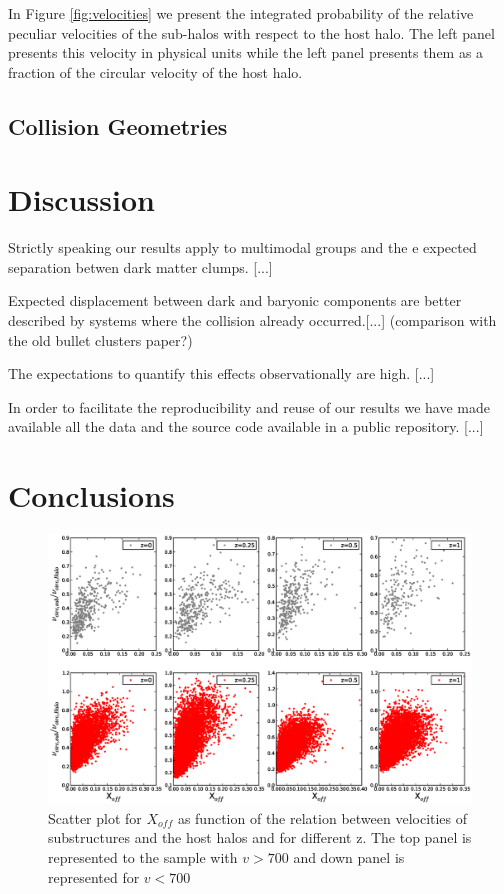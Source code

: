 \documentclass{emulateapj}
\newcommand{\kms}{{\ifmmode{{\mathrm{\,km\ s}^{-1}}}\else{\,km~s$^{-1}$}\fi}}
\begin{document}
In Figure \ref{fig:velocities} we present the integrated probability
of the relative peculiar velocities of the sub-halos with respect to
the host halo. The left panel presents this velocity in physical units
while the left panel presents them as a fraction of the circular
velocity of the host halo. 



\subsection{Collision Geometries}
\label{fig:geometry}

\section{Discussion}
\label{sec:discussion}
Strictly speaking our results apply to multimodal groups and the e
expected separation betwen dark matter clumps. [...]
 
Expected displacement between dark and baryonic components are better
described by systems where the collision already occurred.[...]
(comparison with the old bullet clusters paper?)

The expectations to quantify this effects observationally are
high. [...] 


In order to facilitate the reproducibility and reuse of our results we
have made available all the data and the source code available in a public
repository. [...]  


\section{Conclusions}
\label{sec:conclusions}


\begin{figure}
\begin{center}
\includegraphics[width=1.0\textwidth]{Figures_eps/figure_5_4.eps}
\end{center}
\caption{Scatter plot for $X_{off}$ as function of the relation between velocities of substructures and the host halos and 
for different z. The top panel is represented to the sample with $v > 700$ \kms and down panel is represented 
for $v<700$ \kms} 
\label{cos_theta1}
\end{figure}
\end{document}
